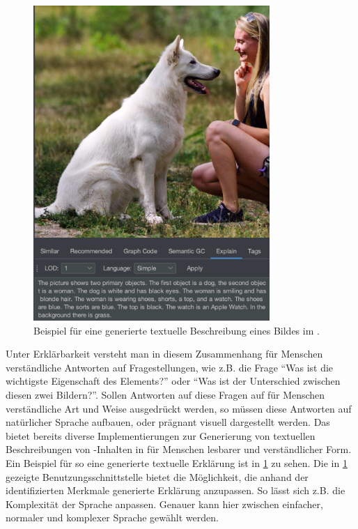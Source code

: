 \begin{figure}[htb]
    \centering
    \includegraphics[width=0.8\textwidth]{resources/images/gmaf-explain-ui-dog-man-example.png}
    \caption{Beispiel für eine generierte textuelle Beschreibung eines Bildes im \gmaf{}.}
    \label{sec1:intro:subsec:motivation:fig:gmaf-explain-ui-dog-man-example}
\end{figure}
\noindent
Unter Erklärbarkeit versteht man in diesem Zusammenhang für Menschen verständliche Antworten auf Fragestellungen, wie z.B. die Frage \enquote{Was ist die wichtigste Eigenschaft des Elements?} oder \enquote{Was ist der Unterschied zwischen diesen zwei Bildern?}.
Sollen Antworten auf diese Fragen auf für Menschen verständliche Art und Weise ausgedrückt werden, so müssen diese Antworten auf natürlicher Sprache aufbauen, oder prägnant visuell dargestellt werden.
Das \gmaf{} bietet bereits diverse Implementierungen zur Generierung von textuellen Beschreibungen von \mmir{}-Inhalten in für Menschen lesbarer und verständlicher Form. 
Ein Beispiel für so eine generierte textuelle Erklärung ist in \cref{sec1:intro:subsec:motivation:fig:gmaf-explain-ui-dog-man-example} zu sehen.
Die in \cref{sec1:intro:subsec:motivation:fig:gmaf-explain-ui-dog-man-example} gezeigte Benutzungsschnittstelle bietet die Möglichkeit, die anhand der identifizierten Merkmale generierte Erklärung anzupassen. 
So lässt sich z.B. die Komplexität der Sprache anpassen. 
Genauer kann hier zwischen einfacher, normaler und komplexer Sprache gewählt werden.



